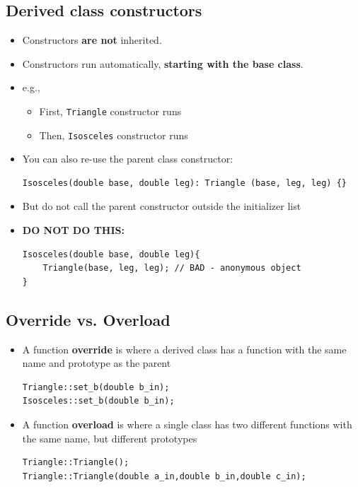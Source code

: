 \subsection{Derived class constructors}
\begin{itemize}
	\item Constructors \textbf{are not} inherited.
	\item Constructors run automatically, \textbf{starting with the base class}.
	\item e.g.,
	\begin{itemize}
		\item First, \lstinline[style=C++]{Triangle} constructor runs
		\item Then, \lstinline[style=C++]{Isosceles} constructor runs
	\end{itemize}
	\item You can also re-use the parent class constructor:
\begin{lstlisting}[style=C++]
Isosceles(double base, double leg): Triangle (base, leg, leg) {}
\end{lstlisting}
	\item But do not call the parent constructor outside the initializer list
	\item \textbf{DO NOT DO THIS:}
\begin{lstlisting}[style=C++]
Isosceles(double base, double leg){
	Triangle(base, leg, leg); // BAD - anonymous object
}
\end{lstlisting}
\end{itemize}

\subsection{Override vs. Overload}
\begin{itemize}
	\item A function \textbf{override} is where a derived class has a function with the same name and prototype as the parent
\begin{lstlisting}[style=C++]
Triangle::set_b(double b_in);
Isosceles::set_b(double b_in);
\end{lstlisting}
	\item A function \textbf{overload} is where a single class has two different functions with the same name, but different prototypes
\begin{lstlisting}[style=C++]
Triangle::Triangle();
Triangle::Triangle(double a_in,double b_in,double c_in);
\end{lstlisting}
\end{itemize}

